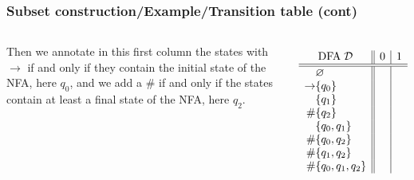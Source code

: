 % 
\begin{frame}
\frametitle{Subset construction/Example/Transition table (cont)}

\begin{columns}

   Then we annotate in this first column the
  states with \(\rightarrow\) if and only if they contain the initial
  state of the NFA, here \(q_0\), and we add a \(\#\) if and only if
  the states contain at least a final state of the NFA, here \(q_2\).

  \[
  \begin{array}{r@{}l||c|c}
    \multicolumn{2}{c||}{\text{DFA} \; {\cal D}} & 0 & 1\\
    \hline\hline
                & \varnothing       & &\\
    \rightarrow & \{q_0\}           & &\\
                & \{q_1\}           & &\\
             \# & \{q_2\}           & &\\
                & \{q_0, q_1\}      & &\\
             \# & \{q_0, q_2\}      & &\\
             \# & \{q_1, q_2\}      & &\\
             \# & \{q_0, q_1, q_2\} & &
  \end{array}
  \]
\end{columns}

\end{frame}

